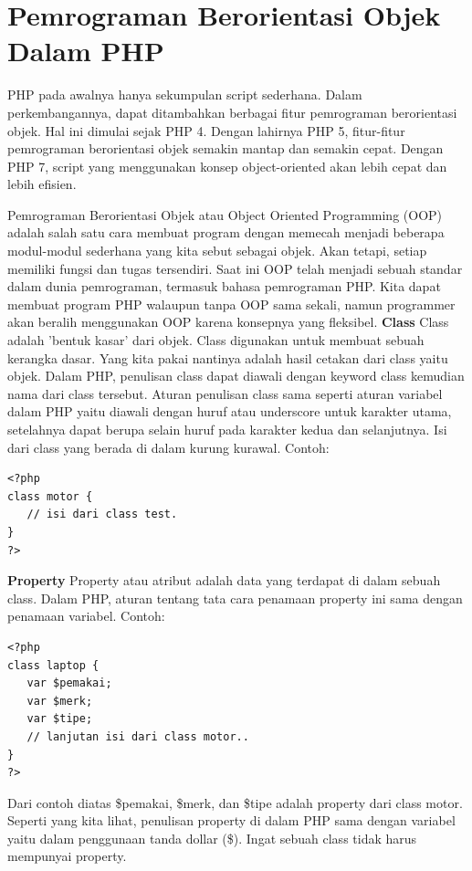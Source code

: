 \section{Pemrograman Berorientasi Objek Dalam PHP }
PHP pada awalnya hanya sekumpulan script sederhana. Dalam perkembangannya, dapat ditambahkan berbagai fitur pemrograman berorientasi objek. Hal ini dimulai sejak PHP 4. Dengan lahirnya PHP 5, fitur-fitur pemrograman berorientasi objek semakin mantap dan semakin cepat. Dengan PHP 7, script yang menggunakan konsep object-oriented akan lebih cepat dan lebih efisien.
\par
Pemrograman Berorientasi Objek atau Object Oriented Programming (OOP) adalah salah satu cara membuat program dengan memecah menjadi beberapa modul-modul sederhana yang kita sebut sebagai objek. Akan tetapi, setiap memiliki fungsi dan tugas tersendiri. Saat ini OOP telah menjadi sebuah standar dalam dunia pemrograman, termasuk bahasa pemrograman PHP. Kita dapat membuat program PHP walaupun tanpa OOP sama sekali, namun programmer akan beralih menggunakan OOP karena konsepnya yang fleksibel. 
\newline
\textbf{Class}
\newline
Class adalah 'bentuk kasar' dari objek. Class digunakan untuk membuat sebuah kerangka dasar. Yang kita pakai nantinya adalah hasil cetakan dari class yaitu objek. Dalam PHP, penulisan class dapat diawali dengan keyword class kemudian nama dari class tersebut. Aturan penulisan class sama seperti aturan variabel dalam PHP yaitu diawali dengan huruf atau underscore untuk karakter utama, setelahnya dapat berupa selain huruf pada karakter kedua dan selanjutnya.  Isi dari class yang berada di dalam kurung kurawal. Contoh:
\begin{lstlisting}
<?php
class motor {
   // isi dari class test.
}
?>
\end{lstlisting}
\textbf{Property}
\newline
Property atau atribut adalah data yang terdapat di dalam sebuah class. Dalam PHP, aturan tentang tata cara penamaan property ini sama dengan penamaan variabel. Contoh:
\begin{lstlisting}
<?php
class laptop {
   var $pemakai;
   var $merk;
   var $tipe;
   // lanjutan isi dari class motor..
}
?>
\end{lstlisting}
Dari contoh diatas \$pemakai, \$merk, dan \$tipe adalah property dari class motor. Seperti yang kita lihat, penulisan property di dalam PHP sama dengan variabel yaitu dalam penggunaan tanda dollar (\$). Ingat sebuah class tidak harus mempunyai property.

